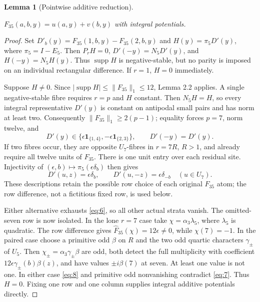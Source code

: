 \documentclass[11pt]{amsart}
\numberwithin{theorem}{section}
\newtheorem{lemma}[theorem]{Lemma}
\theoremstyle{remark}
\numberwithin{equation}{section}
\begin{document}
\begin{lemma}[Pointwise additive reduction]\label{lemma:8.1}

\(F_{35}(a,b,y)=u(a,y)+v(b,y)\) with integral potentials.

\end{lemma}
\begin{proof}

Set \(D'_b(y)=F_{35}(1,b,y)-F_{35}(2,b,y)\) and
\(H(y)=\pi_5D'(y)\), where \(\pi_5=I-E_5\). Then
\(P_rH=0\), \(D'(-y)=N_5D'(y)\), and \(H(-y)=N_5H(y)\).
Thus \(\operatorname{supp}H\) is negative-stable, but no parity is imposed
on an individual rectangular difference. If \(r=1\), \(H=0\) immediately.

Suppose \(H\ne0\). Since \(|\operatorname{supp}H|\le\|F_{35}\|_1\le12\),
Lemma 2.2 applies. A single negative-stable fibre requires \(r=p\) and
\(H\) constant. Then \(N_5H=H\), so every integral representative
\(D'(y)\) is constant on antipodal small pairs and has norm at least two.
Consequently \(\|F_{35}\|_1\ge2(p-1)\); equality forces \(p=7\), norm
twelve, and
\[
D'(y)\in\{\epsilon\mathbf1_{\{1,4\}},-\epsilon\mathbf1_{\{2,3\}}\},
\qquad D'(-y)=D'(y).
\]
If two fibres occur, they are opposite \(U_7\)-fibres in \(r=7R\),
\(R>1\), and already require all twelve units of \(F_{35}\). There is
one unit entry over each residual site. Injectivity of
\((\epsilon,b)\mapsto\pi_5(\epsilon\delta_b)\) then gives
\[
D'(u,z)=\epsilon\delta_b,\qquad
D'(u,-z)=\epsilon\delta_{-b}\quad(u\in U_7).
\]
These descriptions retain the possible row choice of each original
\(F_{35}\) atom; the row difference, not a fictitious fixed row, is used
below.

Either alternative exhausts \eqref{eq:6}, so all other actual strata vanish. The
omitted-seven row is now isolated. In the lone \(r=7\) case take
\(\chi=\alpha_3\lambda_5\), where \(\lambda_5\) is quadratic. The row
difference gives \(\widehat F_{35}(\chi)=12\epsilon\ne0\), while
\(\chi(7)=-1\). In the paired case choose a primitive odd \(\beta\)
on \(R\) and the two odd quartic characters \(\gamma_\pm\) of
\(U_5\). Then \(\chi_\pm=\alpha_3\gamma_\pm\beta\) are odd, both
detect the full multiplicity with coefficient
\(12\epsilon\gamma_\pm(b)\beta(z)\), and have values
\(\pm i\beta(7)\) at seven. At least one value is not one. In either
case \eqref{eq:8} and primitive odd nonvanishing contradict \eqref{eq:7}. Thus \(H=0\).
Fixing one row and one column supplies integral additive potentials directly.
\end{proof}
\end{document}
